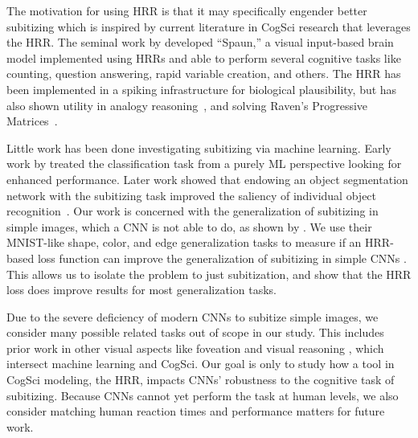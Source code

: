 \documentclass[letterpaper]{article} %
\begin{document}
\par
The motivation for using HRR is that it may specifically engender better subitizing which is inspired by current literature in CogSci research that leverages the HRR. The seminal work by \cite{Eliasmith2012} developed ``Spaun,''\cite{Choo2018} a visual input-based brain model implemented using HRRs and able to perform several cognitive tasks like counting,
question answering, rapid variable creation, and others. The HRR has been implemented in a spiking infrastructure \cite{10.3389/fninf.2013.00048} for biological plausibility, but has also shown utility in analogy reasoning~\cite{Eliasmith2001IntegratingSA}, and solving Raven’s Progressive Matrices~\cite{10.1111/j.1756-8765.2010.01127.x}.
\par
Little work has been done investigating subitizing via machine learning. Early work by \cite{Zhang2015c} treated the classification task from a purely ML perspective looking for enhanced performance. Later work showed that endowing an object segmentation network with the subitizing task improved the saliency of individual object recognition~\cite{He2017, Islam2018}. Our work is concerned with the generalization of subitizing in simple images, which a CNN is not able to do, as shown by \cite{b1}. We use their MNIST-like shape, color, and edge generalization tasks to measure if an HRR-based loss function can improve the generalization of subitizing in simple CNNs \cite{b1}. This allows us to isolate the problem to just subitization, and show that the HRR loss does improve results for most generalization tasks.
\par
Due to the severe deficiency of modern CNNs to subitize simple images, we consider many possible related tasks out of scope in our study. This includes prior work in other visual aspects like foveation \cite{10.1145/3355089.3356557} and visual reasoning \cite{10.5555/3495724.3497106}, which intersect machine learning and CogSci. Our goal is only to study how a tool in CogSci modeling, the HRR, impacts CNNs' robustness to the cognitive task of subitizing. Because CNNs cannot yet perform the task at human levels, we also consider matching human reaction times and performance matters for future work.
\end{document}

